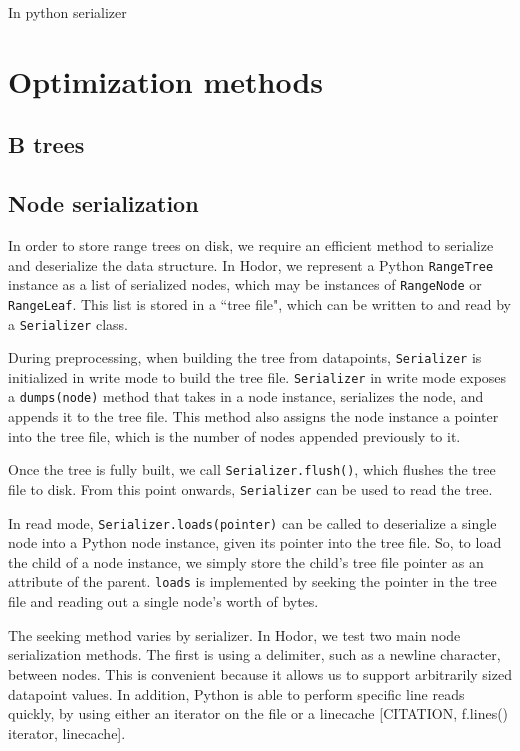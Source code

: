 \documentclass[11pt, oneside]{article}
\begin{document}
In python
serializer


\section{Optimization methods}

\subsection{B trees}


\subsection{Node serialization}

In order to store range trees on disk, we require an efficient method to
serialize and deserialize the data structure. In Hodor, we represent a Python
\texttt{RangeTree} instance as a list of serialized nodes, which may be
instances of \texttt{RangeNode} or \texttt{RangeLeaf}. This list is stored in a
``tree file", which can be written to and read by a \texttt{Serializer} class. 

During preprocessing, when building the tree from datapoints,
\texttt{Serializer} is initialized in write mode to build the tree file.
\texttt{Serializer} in write mode exposes a \texttt{dumps(node)} method that
takes in a node instance, serializes the node, and appends it to the tree file.
This method also assigns the node instance a pointer into the tree file, which
is the number of nodes appended previously to it. 

Once the tree is fully built, we call \texttt{Serializer.flush()}, which
flushes the tree file to disk. From this point onwards, \texttt{Serializer} can
be used to read the tree.

In read mode, \texttt{Serializer.loads(pointer)} can be called to deserialize a
single node into a Python node instance, given its pointer into the tree file.
So, to load the child of a node instance, we simply store the child's tree file
pointer as an attribute of the parent. \texttt{loads} is implemented by seeking
the pointer in the tree file and reading out a single node's worth of bytes.

The seeking method varies by serializer. In Hodor, we test two main node
serialization methods. The first is using a delimiter, such as a newline
character, between nodes. This is convenient because it allows us to support
arbitrarily sized datapoint values. In addition, Python is able to perform
specific line reads quickly, by using either an iterator on the file or a
linecache [CITATION, f.lines() iterator, linecache]. 
\end{document}

